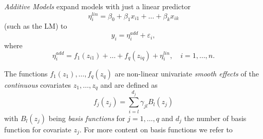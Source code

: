
\textit{Additive Models} expand models with just a linear predictor  
$$
\eta_{i}^{lin} = \beta_{0}+\beta_{1} x_{i1}+\ldots+\beta_{k} x_{i k}
$$
(such as the \ac{LM}) to 
\begin{equation}
y_{i} = \eta_{i}^{add} + \varepsilon_{i} ,
\end{equation}
where 
\begin{equation}
\eta_{i}^{a d d}=f_{1}\left(z_{i 1}\right)+\ldots+f_{q}\left(z_{i q}\right)+\eta_{i}^{l i n}, \quad i = 1, \ldots, n.
\end{equation}

The functions $f_{1}(z_{1}), \ldots, f_{q}(z_{q})$ are non-linear univariate \textit{smooth effects} of the \textit{continuous} covariates $z_1, \ldots, z_q$ and are defined as
\begin{equation}
f_{j}\left(z_{j}\right)=\sum_{i=l}^{d_{j}} \gamma_{j l} B_{l}\left(z_{j}\right)
\end{equation}
with $B_{l}\left(z_{j}\right)$ being \textit{basis functions} for $j = 1, \ldots, q$ and $d_j$ the number of basis function for covariate $z_j$. For more content on basis functions we refer to \cite{wood2017generalized}




